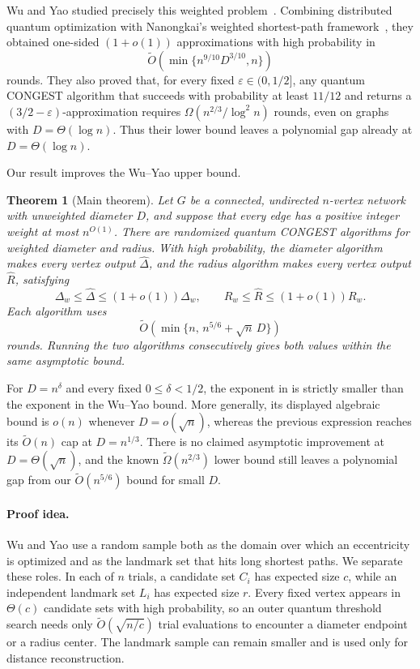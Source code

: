\documentclass[11pt]{article}
\newtheorem{theorem}{Theorem}[section]
\theoremstyle{definition}
\newcommand{\eps}{\varepsilon}
\newcommand{\diamw}{\Delta_w}
\newcommand{\radw}{R_w}
\newcommand{\wtO}{\widetilde O}
\newcommand{\wtOmega}{\widetilde\Omega}
\begin{document}
Wu and Yao studied precisely this weighted problem~\cite{WuYao2022}.  Combining
distributed quantum optimization with Nanongkai's weighted shortest-path
framework~\cite{Nanongkai2014}, they obtained one-sided $(1+o(1))$
approximations with high probability in
\[
  \wtO\!\left(\min\{n^{9/10}D^{3/10},n\}\right)
\]
rounds.  They also proved that, for every fixed $\eps\in(0,1/2]$, any quantum
CONGEST algorithm that succeeds with probability at least $11/12$ and returns
a $(3/2-\eps)$-approximation requires
$\Omega(n^{2/3}/\log^2 n)$ rounds, even on graphs with
$D=\Theta(\log n)$.  Thus their lower bound leaves a polynomial gap already at
$D=\Theta(\log n)$.

Our result improves the Wu--Yao upper bound.

\begin{theorem}[Main theorem]
\label{thm:main}
Let $G$ be a connected, undirected $n$-vertex network with unweighted diameter
$D$, and suppose that every edge has a positive integer weight at most
$n^{O(1)}$.  There are randomized quantum CONGEST algorithms for weighted
diameter and radius.  With high probability, the diameter algorithm makes
every vertex output $\widehat\Delta$, and the radius algorithm makes every
vertex output $\widehat R$, satisfying
\[
  \diamw\leq \widehat\Delta\leq(1+o(1))\diamw,
  \qquad
  \radw\leq \widehat R\leq(1+o(1))\radw.
\]
Each algorithm uses
\[
  \wtO\!\left(\min\{n,\,n^{5/6}+\sqrt n\,D\}\right)
\]
rounds.  Running the two algorithms consecutively gives both values within the
same asymptotic bound.
\end{theorem}

For $D=n^\delta$ and every fixed $0\leq\delta<1/2$, the exponent in
 is strictly smaller than the exponent in the Wu--Yao bound.
More generally, its displayed algebraic bound is $o(n)$ whenever
$D=o(\sqrt n)$, whereas the previous expression reaches its $\wtO(n)$ cap at
$D=n^{1/3}$.  There is no claimed asymptotic improvement at
$D=\Theta(\sqrt n)$, and the known $\wtOmega(n^{2/3})$ lower bound still leaves
a polynomial gap from our $\wtO(n^{5/6})$ bound for small $D$.

\paragraph{Proof idea.}
Wu and Yao use a random sample both as the domain over which an eccentricity is
optimized and as the landmark set that hits long shortest paths.  We separate
these roles.  In each of $n$ trials, a candidate set $C_i$ has expected size
$c$, while an independent landmark set $L_i$ has expected size $r$.  Every
fixed vertex appears in $\Theta(c)$ candidate sets with high probability, so
an outer quantum threshold search needs only
$\wtO(\sqrt{n/c})$ trial evaluations to encounter a diameter endpoint or a
radius center.  The landmark sample can remain smaller and is used only for
distance reconstruction.
\end{document}
